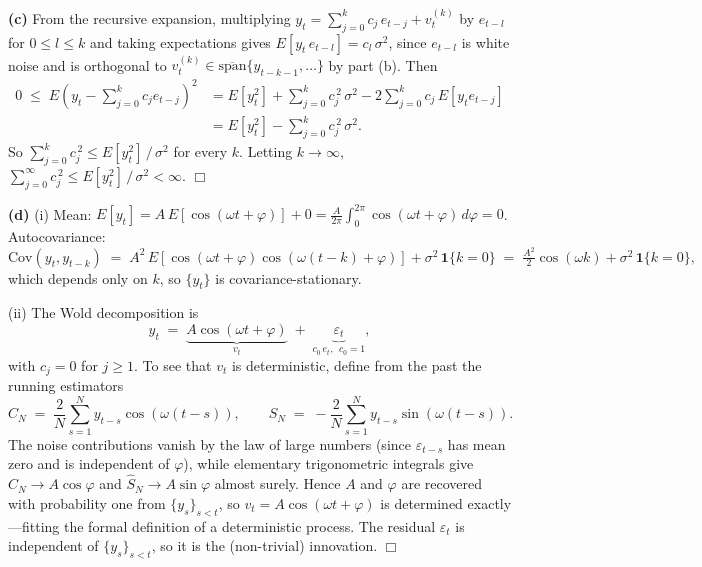\documentclass[11pt]{article}
\begin{document}
\textbf{(c)} From the recursive expansion, multiplying $y_t = \sum_{j=0}^{k} c_j\, e_{t-j} + v_t^{(k)}$ by $e_{t-l}$ for $0 \leq l \leq k$ and taking expectations gives $E[y_t\, e_{t-l}] = c_l\, \sigma^2$, since $e_{t-l}$ is white noise and is orthogonal to $v_t^{(k)} \in \overline{\mathrm{span}}\{y_{t-k-1},\ldots\}$ by part (b). Then
\begin{align*}
0 \;\leq\; E\!\left(y_t - \sum_{j=0}^{k} c_j e_{t-j}\right)^{\!2}
&= E[y_t^2] + \sum_{j=0}^{k} c_j^{\,2}\, \sigma^2 - 2\sum_{j=0}^{k} c_j\, E[y_t e_{t-j}] \\
&= E[y_t^2] - \sum_{j=0}^{k} c_j^{\,2}\, \sigma^2.
\end{align*}
So $\sum_{j=0}^{k} c_j^{\,2} \leq E[y_t^2]\,/\, \sigma^2$ for every $k$. Letting $k \to \infty$, $\sum_{j=0}^{\infty} c_j^{\,2} \leq E[y_t^2]\,/\, \sigma^2 < \infty$. \hfill$\Box$

\textbf{(d)} (i) Mean: $E[y_t] = A\, E[\cos(\omega t + \varphi)] + 0 = \tfrac{A}{2\pi}\!\int_0^{2\pi}\!\cos(\omega t + \varphi)\,d\varphi = 0$. Autocovariance:
\[
\mathrm{Cov}(y_t, y_{t-k}) \;=\; A^2\, E[\cos(\omega t + \varphi)\cos(\omega(t-k)+\varphi)] + \sigma^2\, \mathbf{1}\{k=0\} \;=\; \tfrac{A^2}{2}\cos(\omega k) + \sigma^2\, \mathbf{1}\{k=0\},
\]
which depends only on $k$, so $\{y_t\}$ is covariance-stationary.

(ii) The Wold decomposition is
\[
y_t \;=\; \underbrace{A\cos(\omega t + \varphi)}_{v_t} \;+\; \underbrace{\varepsilon_t}_{c_0\, e_t,\;\, c_0=1},
\]
with $c_j = 0$ for $j \geq 1$. To see that $v_t$ is deterministic, define from the past the running estimators
\[
\hat C_N \;=\; \frac{2}{N}\sum_{s=1}^{N} y_{t-s}\cos(\omega(t-s)),\qquad
\hat S_N \;=\; -\frac{2}{N}\sum_{s=1}^{N} y_{t-s}\sin(\omega(t-s)).
\]
The noise contributions vanish by the law of large numbers (since $\varepsilon_{t-s}$ has mean zero and is independent of $\varphi$), while elementary trigonometric integrals give $\hat C_N \to A\cos\varphi$ and $\hat S_N \to A\sin\varphi$ almost surely. Hence $A$ and $\varphi$ are recovered with probability one from $\{y_s\}_{s<t}$, so $v_t = A\cos(\omega t + \varphi)$ is determined exactly---fitting the formal definition of a deterministic process. The residual $\varepsilon_t$ is independent of $\{y_s\}_{s<t}$, so it is the (non-trivial) innovation. \hfill$\Box$

\vspace{1em}





\end{document}
